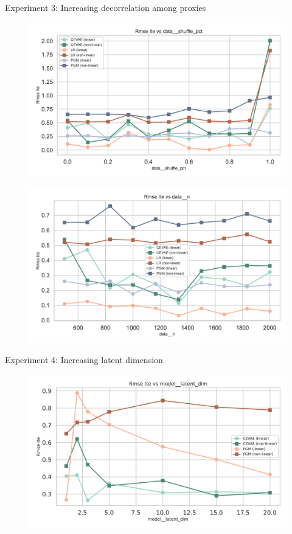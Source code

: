 \documentclass[10pt]{beamer}
\begin{document}
\begin{frame}{Experiment 3: Increasing decorrelation among proxies}
    \begin{figure}[H]
      \includegraphics[width=\textwidth]{../src/results/MyRun_data__shuffle_pct--rmse_ite.pdf}
    \end{figure}
  \begin{figure}[H]
      \includegraphics[width=\textwidth]{../src/results/MyRun_data__n--rmse_ite.pdf}
    \end{figure}
\end{frame}

\begin{frame}{Experiment 4: Increasing latent dimension}
    \begin{figure}[H]
      \includegraphics[width=\textwidth]{../src/results/MyRun_model__latent_dim--rmse_ite.pdf}
    \end{figure}
\end{frame}
\end{document}
